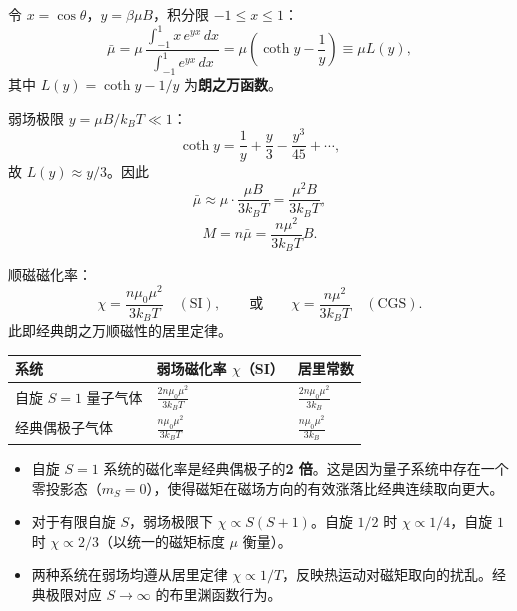 \begin{derivationbox}[标准解题过程]
令 $x=\cos\theta$，$y=\beta\mu B$，积分限 $-1\le x\le1$：
\begin{equation}
\bar{\mu}=\mu\,\frac{\int_{-1}^1x\,e^{yx}\,dx}{\int_{-1}^1e^{yx}\,dx}
=\mu\left(\coth y-\frac{1}{y}\right)\equiv\mu L(y),
\end{equation}
其中 $L(y)=\coth y-1/y$ 为\textbf{朗之万函数}。

弱场极限 $y=\mu B/k_BT\ll1$：
\begin{equation}
\coth y=\frac{1}{y}+\frac{y}{3}-\frac{y^3}{45}+\cdots,
\end{equation}
故 $L(y)\approx y/3$。因此
\begin{equation}
\bar{\mu}\approx\mu\cdot\frac{\mu B}{3k_BT}=\frac{\mu^2B}{3k_BT},
\end{equation}
\begin{equation}
M=n\bar{\mu}=\frac{n\mu^2}{3k_BT}B.
\end{equation}

顺磁磁化率：
\begin{equation}
\boxed{\chi=\frac{n\mu_0\mu^2}{3k_BT}\quad(\text{SI}),\qquad\text{或}\qquad\chi=\frac{n\mu^2}{3k_BT}\quad(\text{CGS}).}
\end{equation}
此即经典朗之万顺磁性的居里定律。
\end{derivationbox}

\begin{formulabox}[答案汇总]
\begin{center}
\begin{tabular}{lll}
\toprule
\textbf{系统} & \textbf{弱场磁化率 $\chi$（SI）} & \textbf{居里常数} \\
\midrule
自旋 $S=1$ 量子气体 & $\displaystyle\frac{2n\mu_0\mu^2}{3k_BT}$ & $\displaystyle\frac{2n\mu_0\mu^2}{3k_B}$ \\
经典偶极子气体 & $\displaystyle\frac{n\mu_0\mu^2}{3k_BT}$ & $\displaystyle\frac{n\mu_0\mu^2}{3k_B}$ \\
\bottomrule
\end{tabular}
\end{center}
\end{formulabox}

\begin{insightbox}[物理图像]
\begin{itemize}
    \item 自旋 $S=1$ 系统的磁化率是经典偶极子的\textbf{2 倍}。这是因为量子系统中存在一个零投影态（$m_S=0$），使得磁矩在磁场方向的有效涨落比经典连续取向更大。
    \item 对于有限自旋 $S$，弱场极限下 $\chi\propto S(S+1)$。自旋 $1/2$ 时 $\chi\propto1/4$，自旋 $1$ 时 $\chi\propto2/3$（以统一的磁矩标度 $\mu$ 衡量）。
    \item 两种系统在弱场均遵从居里定律 $\chi\propto1/T$，反映热运动对磁矩取向的扰乱。经典极限对应 $S\to\infty$ 的布里渊函数行为。
\end{itemize}
\end{insightbox}
